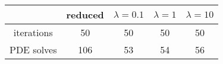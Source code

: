 \begin{tabular}{ccccc}
& reduced & $\lambda = 0.1$ & $\lambda = 1$ & $\lambda = 10$ \\
\hline
iterations & 50 & 50 & 50 & 50 \\
PDE solves & 106 & 53 & 54 & 56 \\
\hline
\end{tabular}
